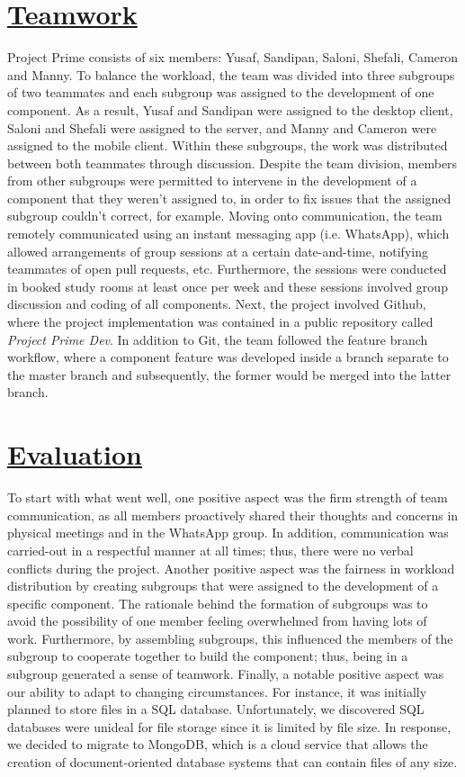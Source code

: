 \documentclass{article}
\begin{document}
\section{\underline{Teamwork}}
Project Prime consists of six members: Yusaf, Sandipan, Saloni, Shefali, Cameron and Manny. To balance the workload, the team was divided into three subgroups of two teammates and each subgroup was assigned to the development of one component. As a result, Yusaf and Sandipan were assigned to the desktop client, Saloni and Shefali were assigned to the server, and Manny and Cameron were assigned to the mobile client. Within these subgroups, the work was distributed between both teammates through discussion. Despite the team division, members from other subgroups were permitted to intervene in the development of a component that they weren't assigned to, in order to fix issues that the assigned subgroup couldn't correct, for example. Moving onto communication, the team remotely communicated using an instant messaging app (i.e. WhatsApp), which allowed arrangements of group sessions at a certain date-and-time, notifying teammates of open pull requests, etc. Furthermore, the sessions were conducted in booked study rooms at least once per week and these sessions involved group discussion and coding of all components. Next, the project involved Github, where the project implementation was contained in a public repository called \textit{Project Prime Dev}. In addition to Git, the team followed the feature branch workflow, where a component feature was developed inside a branch separate to the master branch and subsequently, the former would be merged into the latter branch.

\section{\underline{Evaluation}}
To start with what went well, one positive aspect was the firm strength of team communication, as all members proactively shared their thoughts and concerns in physical meetings and in the WhatsApp group. In addition, communication was carried-out in a respectful manner at all times; thus, there were no verbal conflicts during the project. Another positive aspect was the fairness in workload distribution by creating subgroups that were assigned to the development of a specific component. The rationale behind the formation of subgroups was to avoid the possibility of one member feeling overwhelmed from having lots of work. Furthermore, by assembling subgroups, this influenced the members of the subgroup to cooperate together to build the component; thus, being in a subgroup generated a sense of teamwork. Finally, a notable positive aspect was our ability to adapt to changing circumstances. For instance, it was initially planned to store files in a SQL database. Unfortunately, we discovered SQL databases were unideal for file storage since it is limited by file size. In response, we decided to migrate to MongoDB, which is a cloud service that allows the creation of document-oriented database systems that can contain files of any size.
\end{document}
